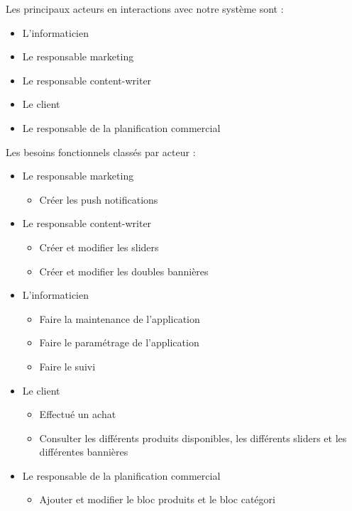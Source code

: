 Les principaux acteurs en interactions avec notre système sont :

	\begin{itemize}[label=\textbullet, font=\LARGE \color{blue}] 
		\item L'informaticien
		\item Le responsable marketing	
		\item Le responsable content-writer
		\item Le client
		\item Le responsable de la planification commercial
	\end{itemize}
	
	Les besoins fonctionnels classés par acteur :
	
	\begin{itemize}[label=\textbullet, font=\LARGE \color{blue}] 
		\item Le responsable marketing
			\begin{itemize}[label=\textbullet, font=\LARGE \color{black}] 
				\item Créer les push notifications
			\end{itemize}
		\item Le responsable content-writer
			\begin{itemize}[label=\textbullet, font=\LARGE \color{black}] 
				\item Créer et modifier les sliders
				\item Créer et modifier les doubles bannières
			\end{itemize}
		\item L'informaticien
			\begin{itemize}[label=\textbullet, font=\LARGE \color{black}] 
				\item Faire la maintenance de l'application
				\item Faire le paramétrage de l'application
				\item Faire le suivi
			\end{itemize}
		\item Le client
			\begin{itemize}[label=\textbullet, font=\LARGE \color{black}] 
				\item Effectué un achat 
				\item Consulter les différents produits disponibles, les différents sliders et les différentes bannières
			\end{itemize}
		\item Le responsable de la planification commercial
			\begin{itemize}[label=\textbullet, font=\LARGE \color{black}] 
				\item Ajouter et modifier le bloc produits et le bloc catégori
			\end{itemize}
	\end{itemize}
	
